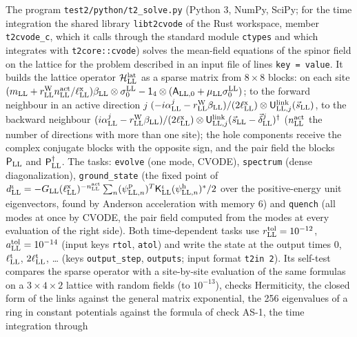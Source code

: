 \documentclass[
  10pt,
]{article}
\begin{document}
The program \texttt{test2/python/t2\_solve.py} (Python 3, NumPy, SciPy;
for the time integration the shared library \texttt{libt2cvode} of the
Rust workspace, member \texttt{t2cvode\_c}, which it calls through the
standard module \texttt{ctypes} and which integrates with
\texttt{t2core::cvode}) solves the mean-field equations of the spinor
field on the lattice for the problem described in an input file of lines
\texttt{key\ =\ value}. It builds the lattice operator
\(\mathcal H^{\rm lat}_{\rm LL}\) as a sparse matrix from \(8\times8\)
blocks: on each site
\((m_{\rm LL}+r^{\rm W}_{\rm LL}n^{\rm act}_{\rm LL}/\ell^{\rm x}_{\rm LL})\beta_{\rm LL}\otimes\sigma^{\rm LL}_0-\mathsf 1_4\otimes(\mathsf A_{{\rm LL},0}+\mu_{\rm LL}\sigma^{\rm LL}_0)\);
to the forward neighbour in an active direction \(j\)
\((-i\alpha^j_{\rm LL}-r^{\rm W}_{\rm LL}\beta_{\rm LL})/(2\ell^{\rm x}_{\rm LL})\otimes\mathsf U^{\rm link}_{{\rm LL},j}(\vec s_{\rm LL})\),
to the backward neighbour
\((i\alpha^j_{\rm LL}-r^{\rm W}_{\rm LL}\beta_{\rm LL})/(2\ell^{\rm x}_{\rm LL})\otimes\mathsf U^{\rm link}_{{\rm LL},j}(\vec s_{\rm LL}-\vec\delta^j_{\rm LL})^\dagger\)
(\(n^{\rm act}_{\rm LL}\) the number of directions with more than one
site); the hole components receive the complex conjugate blocks with the
opposite sign, and the pair field the blocks \(\mathsf P_{\rm LL}\) and
\(\mathsf P^\dagger_{\rm LL}\). The tasks: \texttt{evolve} (one mode,
CVODE), \texttt{spectrum} (dense diagonalization),
\texttt{ground\_state} (the fixed point of
\(d^\iota_{\rm LL}=-G_{\rm LL}(\ell^{\rm x}_{\rm LL})^{-n^{\rm act}_{\rm LL}}\sum_n(\psi^{\rm p}_{{\rm LL},n})^T\mathsf K^\iota_{\rm LL}(\psi^{\rm h}_{{\rm LL},n})^*/2\)
over the positive-energy unit eigenvectors, found by Anderson
acceleration with memory 6) and \texttt{quench} (all modes at once by
CVODE, the pair field computed from the modes at every evaluation of the
right side). Both time-dependent tasks use
\(r^{\rm tol}_{\rm LL}=10^{-12}\), \(a^{\rm tol}_{\rm LL}=10^{-14}\)
(input keys \texttt{rtol}, \texttt{atol}) and write the state at the
output times \(0\), \(\ell^{\rm t}_{\rm LL}\),
\(2\ell^{\rm t}_{\rm LL}\), \ldots{} (keys \texttt{output\_step},
\texttt{outputs}; input format \texttt{t2in\ 2}). Its self-test compares
the sparse operator with a site-by-site evaluation of the same formulas
on a \(3\times4\times2\) lattice with random fields (to \(10^{-13}\)),
checks Hermiticity, the closed form of the links against the general
matrix exponential, the 256 eigenvalues of a ring in constant potentials
against the formula of check AS-1, the time integration through
\end{document}
